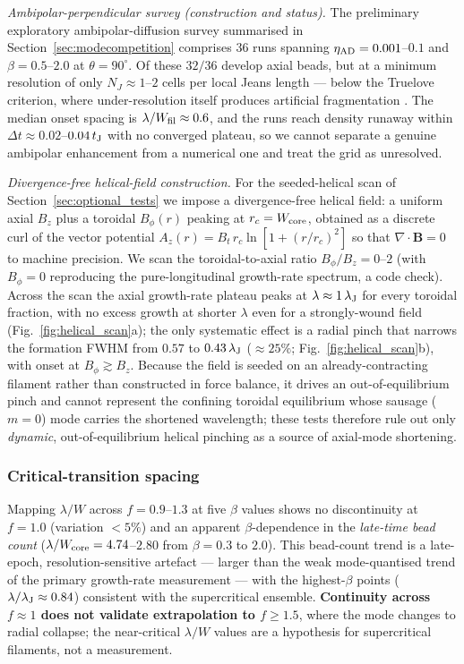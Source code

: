 \documentclass[usenatbib,twoside,twocolumn]{mnras}
\begin{document}
\smallskip\noindent\emph{Ambipolar-perpendicular survey (construction and status).} The preliminary exploratory ambipolar-diffusion survey summarised in Section~\ref{sec:modecompetition} comprises 36 runs spanning $\eta_{\rm AD}=0.001$--$0.1$ and $\beta=0.5$--$2.0$ at $\theta=90^\circ$. Of these $32/36$ develop axial beads, but at a minimum resolution of only $N_J\approx1$--$2$ cells per local Jeans length --- below the Truelove criterion, where under-resolution itself produces artificial fragmentation \citep{Truelove1997}. The median onset spacing is $\lambda/W_{\rm fil}\approx0.6$, and the runs reach density runaway within $\Delta t\approx0.02$--$0.04\,t_{\rm J}$ with no converged plateau, so we cannot separate a genuine ambipolar enhancement from a numerical one and treat the grid as unresolved.

\smallskip\noindent\emph{Divergence-free helical-field construction.} For the seeded-helical scan of Section~\ref{sec:optional_tests} we impose a divergence-free helical field: a uniform axial $B_z$ plus a toroidal $B_\phi(r)$ peaking at $r_c=W_{\rm core}$, obtained as a discrete curl of the vector potential $A_z(r)=B_t\,r_c\ln[1+(r/r_c)^2]$ so that $\nabla\!\cdot\!\mathbf{B}=0$ to machine precision. We scan the toroidal-to-axial ratio $B_\phi/B_z=0$--$2$ (with $B_\phi=0$ reproducing the pure-longitudinal growth-rate spectrum, a code check). Across the scan the axial growth-rate plateau peaks at $\lambda\approx1\,\lambda_{\rm J}$ for every toroidal fraction, with no excess growth at shorter $\lambda$ even for a strongly-wound field (Fig.~\ref{fig:helical_scan}a); the only systematic effect is a radial pinch that narrows the formation FWHM from $0.57$ to $0.43\,\lambda_{\rm J}$ ($\approx25\%$; Fig.~\ref{fig:helical_scan}b), with onset at $B_\phi\gtrsim B_z$. Because the field is seeded on an already-contracting filament rather than constructed in force balance, it drives an out-of-equilibrium pinch and cannot represent the confining toroidal equilibrium whose sausage ($m=0$) mode carries the shortened \citet{Fiege2000} wavelength; these tests therefore rule out only \emph{dynamic}, out-of-equilibrium helical pinching as a source of axial-mode shortening.

\subsubsection{Critical-transition spacing}

Mapping $\lambda/W$ across $f=0.9$--$1.3$ at five $\beta$ values shows no discontinuity at $f=1.0$ (variation $<5\%$) and an apparent $\beta$-dependence in the \emph{late-time bead count} ($\lambda/W_{\rm core}=4.74$--$2.80$ from $\beta=0.3$ to $2.0$). This bead-count trend is a late-epoch, resolution-sensitive artefact --- larger than the weak mode-quantised trend of the primary growth-rate measurement --- with the highest-$\beta$ points ($\lambda/\lambda_{\rm J}\approx0.84$) consistent with the supercritical ensemble. \textbf{Continuity across $f\approx1$ does not validate extrapolation to $f\geq1.5$}, where the mode changes to radial collapse; the near-critical $\lambda/W$ values are a hypothesis for supercritical filaments, not a measurement.
\end{document}
